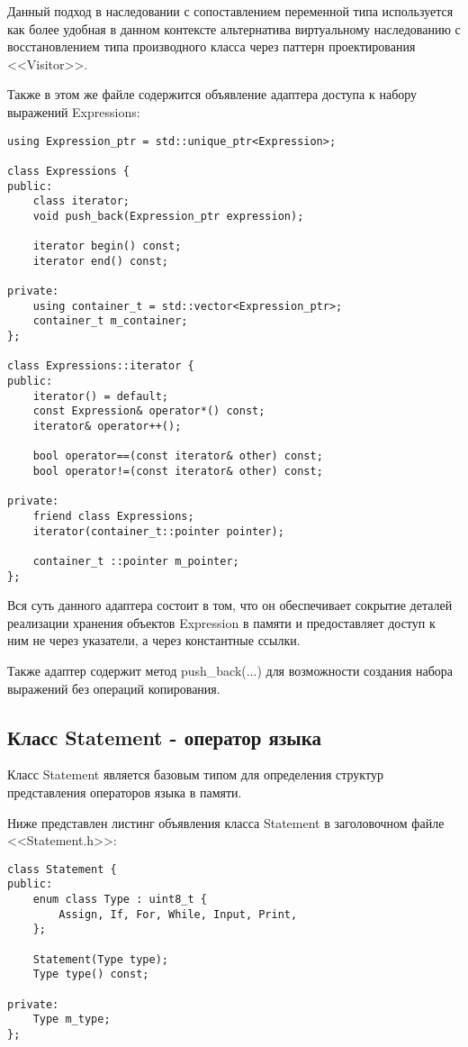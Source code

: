 Данный подход в наследовании с сопоставлением
переменной типа используется как более удобная
в данном контексте альтернатива виртуальному наследованию
с восстановлением типа производного класса через
паттерн проектирования <<Visitor>>.

Также в этом же файле содержится объявление адаптера 
доступа к набору выражений Expressions:

\begin{verbatim}
using Expression_ptr = std::unique_ptr<Expression>;

class Expressions {
public:
    class iterator;
    void push_back(Expression_ptr expression);
    
    iterator begin() const;
    iterator end() const;

private:
    using container_t = std::vector<Expression_ptr>;
    container_t m_container;
};

class Expressions::iterator {
public:
    iterator() = default;
    const Expression& operator*() const;
    iterator& operator++();

    bool operator==(const iterator& other) const;
    bool operator!=(const iterator& other) const;

private:
    friend class Expressions;
    iterator(container_t::pointer pointer);

    container_t ::pointer m_pointer;
};
\end{verbatim}

Вся суть данного адаптера состоит в том,
что он обеспечивает сокрытие деталей реализации 
хранения объектов Expression в памяти
и предоставляет доступ к ним
не через указатели, а через константные ссылки.

Также адаптер содержит метод push\_back(...)
для возможности создания набора выражений
без операций копирования.

\subsection{Класс Statement - оператор языка}

Класс Statement является базовым типом для определения
структур представления операторов языка в памяти.

Ниже представлен листинг объявления класса Statement
в заголовочном файле <<Statement.h>>:

\begin{verbatim}
class Statement {
public:
    enum class Type : uint8_t {
        Assign, If, For, While, Input, Print,
    };

    Statement(Type type);
    Type type() const;

private:
    Type m_type;
};
\end{verbatim}

